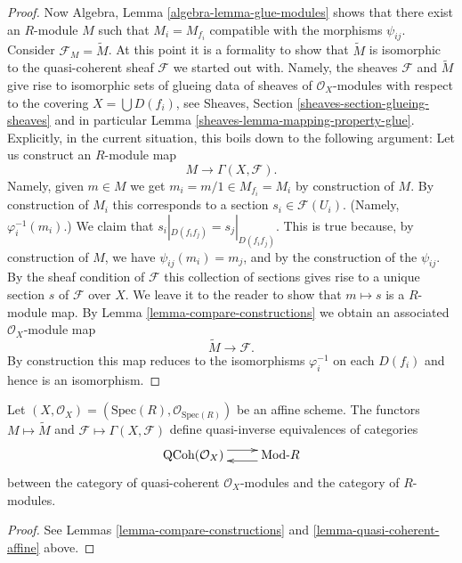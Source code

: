 \begin{proof}
\medskip\noindent
Now Algebra, Lemma \ref{algebra-lemma-glue-modules}
shows that there exist an $R$-module $M$ such that
$M_i = M_{f_i}$ compatible with the morphisms $\psi_{ij}$.
Consider $\mathcal{F}_M = \widetilde M$. At this point it is
a formality to show that $\widetilde M$ is isomorphic to
the quasi-coherent sheaf $\mathcal{F}$ we started out with.
Namely, the sheaves $\mathcal{F}$ and $\widetilde M$ give
rise to isomorphic sets of glueing data of sheaves of $\mathcal{O}_X$-modules
with respect to the covering $X = \bigcup D(f_i)$, see
Sheaves, Section \ref{sheaves-section-glueing-sheaves}
and in particular Lemma \ref{sheaves-lemma-mapping-property-glue}.
Explicitly, in the current situation, this boils down to
the following argument: Let us construct an $R$-module map
$$
M \longrightarrow \Gamma(X, \mathcal{F}).
$$
Namely, given $m \in M$ we get $m_i = m/1 \in M_{f_i} = M_i$
by construction of $M$. By construction of $M_i$ this corresponds
to a section $s_i \in \mathcal{F}(U_i)$. (Namely, $\varphi^{-1}_i(m_i)$.)
We claim that $s_i|_{D(f_if_j)} = s_j|_{D(f_if_j)}$. This is
true because, by construction of $M$, we have $\psi_{ij}(m_i) = m_j$,
and by the construction of the $\psi_{ij}$. By the sheaf condition of
$\mathcal{F}$ this collection of sections gives rise to a unique
section $s$ of $\mathcal{F}$ over $X$. We leave it to the reader
to show that $m \mapsto s$ is a $R$-module map.
By Lemma \ref{lemma-compare-constructions} we obtain an associated
$\mathcal{O}_X$-module map
$$
\widetilde M \longrightarrow \mathcal{F}.
$$
By construction this map reduces to the isomorphisms
$\varphi_i^{-1}$ on each $D(f_i)$ and hence is an isomorphism.
\end{proof}

\begin{lemma}
\label{lemma-equivalence-quasi-coherent}
Let $(X, \mathcal{O}_X) = (\text{Spec}(R), \mathcal{O}_{\text{Spec}(R)})$
be an affine scheme.
The functors $M \mapsto \widetilde M$ and
$\mathcal{F} \mapsto \Gamma(X, \mathcal{F})$ define quasi-inverse
equivalences of categories
$$
\xymatrix{
\text{QCoh}(\mathcal{O}_X)
\ar@<1ex>[r]
&
\text{Mod-}R
\ar@<1ex>[l]
}
$$
between the category of quasi-coherent $\mathcal{O}_X$-modules
and the category of $R$-modules.
\end{lemma}

\begin{proof}
See Lemmas \ref{lemma-compare-constructions}
and \ref{lemma-quasi-coherent-affine} above.
\end{proof}

